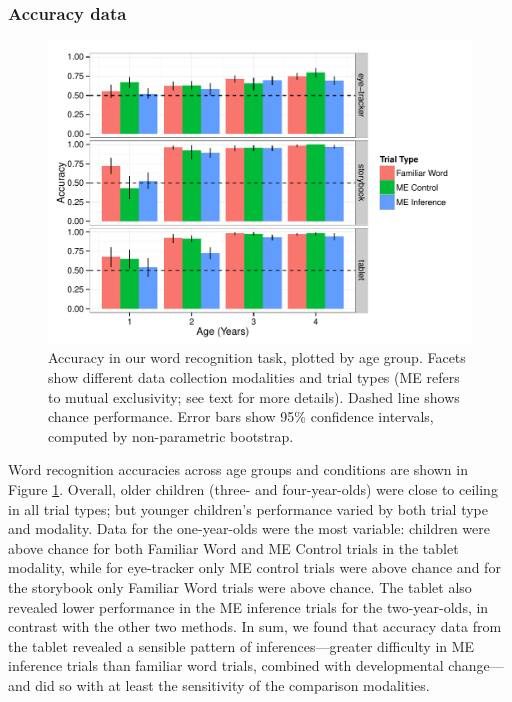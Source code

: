 \documentclass[man,noapacite]{apa2}
\begin{document}
\subsubsection{Accuracy data} 

\begin{figure}[t] 
  \begin{center} 
    \includegraphics[width=5in]{figures/accuracy.pdf} 
    \caption{\label{fig:accuracy} Accuracy in our word recognition task, plotted by age group. Facets show different data collection modalities and trial types (ME refers to mutual exclusivity; see text for more details). Dashed line shows chance performance. Error bars show 95\% confidence intervals, computed by non-parametric bootstrap. }
  \end{center} 
\end{figure}

Word recognition accuracies across age groups and conditions are shown in Figure \ref{fig:accuracy}. Overall, older children (three- and four-year-olds) were close to ceiling in all trial types; but younger children's performance varied by both trial type and modality. Data for the one-year-olds were the most variable: children were above chance for both Familiar Word and ME Control trials in the tablet modality, while for eye-tracker only ME control trials were above chance and for the storybook only Familiar Word trials were above chance. The tablet also revealed lower performance in the ME inference trials for the two-year-olds, in contrast with the other two methods. In sum, we found that accuracy data from the tablet revealed a sensible pattern of inferences---greater difficulty in ME inference trials than familiar word trials, combined with developmental change---and did so with at least the sensitivity of the comparison modalities. 
\end{document}
